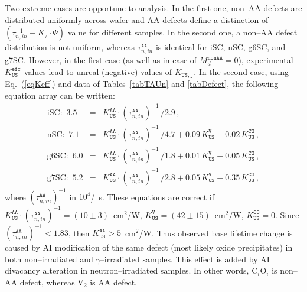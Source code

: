 \documentclass[aip,jap, amsmath,amssymb,reprint]{revtex4-1}
\begin{document}
Two extreme cases are opportune to analysis.
In the first one, non--AA defects are distributed uniformly across wafer and
AA defects define a distinction of
$(\tau_{n,in}^{-1}-K_\tau\cdot\Psi)$ value for different samples.
In the second one, a non--AA defect distribution is not uniform,
whereas $\tau_{n,in}^\mathtt{AA}$ is identical for iSC, nSC, g6SC, and g7SC.
However, in the first case (as well as in case of $M_d^\mathtt{nonAA}=0$),
experimental $K_\mathtt{US}^\mathtt{eff}$ values lead to unreal (negative) values of $K_\mathtt{US,j}$.
In the second case, using Eq.~(\ref{eqKeff}) and data of Tables~\ref{tabTAUn} and \ref{tabDefect}, the following equation array can be written:
\begin{eqnarray}
\mbox{iSC}:\,\,3.5&=&K_\mathtt{US}^\mathtt{AA}\cdot(\tau_{n,in}^\mathtt{AA})^{-1}\,/2.9\,,\nonumber\\
\mbox{nSC}:\,\,7.1&=&K_\mathtt{US}^\mathtt{AA}\cdot(\tau_{n,in}^\mathtt{AA})^{-1}\,/4.7+0.09\,K_\mathtt{US}^\mathtt{V}+0.02\,K_\mathtt{US}^\mathtt{CO}\,,\nonumber\\
\mbox{g6SC}:\,\,6.0&=&K_\mathtt{US}^\mathtt{AA}\cdot(\tau_{n,in}^\mathtt{AA})^{-1}\,/1.8+0.01\,K_\mathtt{US}^\mathtt{V}+0.05\,K_\mathtt{US}^\mathtt{CO}\,,\nonumber\\
\mbox{g7SC}:\,\,5.2&=&K_\mathtt{US}^\mathtt{AA}\cdot(\tau_{n,in}^\mathtt{AA})^{-1}\,/2.8+0.05\,K_\mathtt{US}^\mathtt{V}+0.35\,K_\mathtt{US}^\mathtt{CO}\,,\nonumber
\end{eqnarray}
where
$(\tau_{n,in}^\mathtt{AA})^{-1}$ in $10^4$/~s.
These equations are correct if
$K_\mathtt{US}^\mathtt{AA}\cdot(\tau_{n,in}^\mathtt{AA})^{-1}=(10\pm3)$~cm$^2$/W,
$K_\mathtt{US}^\mathtt{V}=(42\pm15)$~cm$^2$/W,
$K_\mathtt{US}^\mathtt{CO}=0$.
Since $(\tau_{n,in}^\mathtt{AA})^{-1}<1.83$, then $K_\mathtt{US}^\mathtt{AA}>5$~cm$^2$/W.
Thus observed base lifetime change is caused by AI modification of the same defect (most likely oxide precipitates) in
both non--irradiated and $\gamma$--irradiated samples.
This effect is added by AI divacancy alteration in neutron--irradiated samples.
In other words, C$_i$O$_i$ is non--AA defect, whereas V$_2$ is AA defect.
\end{document}
